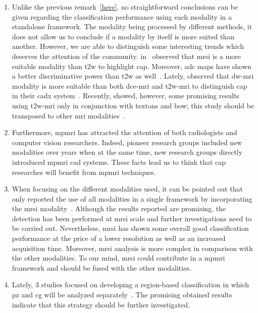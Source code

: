 \begin{enumerate}
\item Unlike the previous remark~\ref{here}, no straightforward conclusions can be given regarding the classification performance using each modality in a standalone framework.
The modality being processed by different methods, it does not allow us to conclude if a modality by itself is more suited than another.
However, we are able to distinguish some interesting trends which deserves the attention of the community.
\citeauthor{Tiwari2013} in~\cite{Tiwari2009a,Tiwari2012,Tiwari2013} observed that \ac{mrsi} is a more suitable modality than \ac{t2w} to highlight \ac{cap}.
Moreover, \ac{adc} maps have shown a better discriminative power than \ac{t2w} as well~\cite{Langer2009,Viswanath2011,Peng2013}.
Lately, \citeauthor{Litjens2014} observed that \ac{dw}-\ac{mri} modality is more suitable than both \ac{dce}-\ac{mri} and \ac{t2w}-\ac{mri} to distinguish \ac{cap} in their \ac{cadx} system~\cite{Litjens2014}. 
Recently, \citeauthor{rampun2016computerb} showed, however, some promising results using \ac{t2w}-\ac{mri} only in conjunction with textons and \ac{bow}; this study should be transposed to other \ac{mri} modalities~\cite{rampun2016computerb}.

\item Furthermore, \ac{mpmri} has attracted the attention of both radiologists and computer vision researchers.
Indeed, pioneer research groups included new modalities over years when at the same time, new research groups directly introduced \ac{mpmri} \ac{cad} systems.
These facts lead us to think that \ac{cap} researches will benefit from \ac{mpmri} techniques.

\item When focusing on the different modalities used, it can be pointed out that only \citeauthor{trigui2017automatic} reported the use of all modalities in a single framework by incorporating the \ac{mrsi} modality~\cite{trigui2016classification,trigui2017automatic}.
Although the results reported are promising, the detection has been performed at \ac{mrsi} scale and further investigations need to be carried out.
Nevertheless, \ac{mrsi} has shown some overall good classification performance at the price of a lower resolution as well as an increased acquisition time.
Moreover, \ac{mrsi} analysis is more complex in comparison with the other modalities.
To our mind, \ac{mrsi} could contribute in a \ac{mpmri} framework and should be fused with the other modalities.

\item Lately, 3 studies focused on developing a region-based classification in which \ac{pz} and \ac{cg} will be analyzed separately~\cite{Viswanath2012,Litjens2012,Litjens2014}.
The promising obtained results indicate that this strategy should be further investigated.


\end{enumerate}
